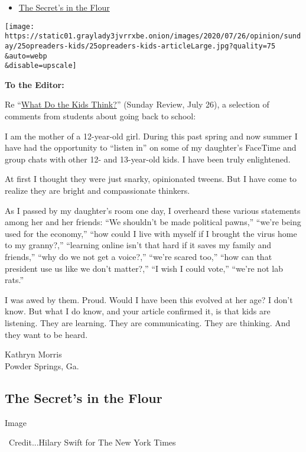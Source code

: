 \begin{itemize}
\tightlist
\item
  \protect\hyperlink{link-4c6cf7c0}{The Secret's in the Flour}
\end{itemize}

\texttt{[image: https://static01.graylady3jvrrxbe.onion/images/2020/07/26/opinion/sunday/25opreaders-kids/25opreaders-kids-articleLarge.jpg?quality=75\\\&auto=webp\\\&disable=upscale]}

\textbf{To the Editor:}

Re
``\href{https://www.nytimes3xbfgragh.onion/2020/07/25/opinion/sunday/coronavirus-kids-school.html}{What
Do the Kids Think?}'' (Sunday Review, July 26), a selection of comments
from students about going back to school:

I am the mother of a 12-year-old girl. During this past spring and now
summer I have had the opportunity to ``listen in'' on some of my
daughter's FaceTime and group chats with other 12- and 13-year-old kids.
I have been truly enlightened.

At first I thought they were just snarky, opinionated tweens. But I have
come to realize they are bright and compassionate thinkers.

As I passed by my daughter's room one day, I overheard these various
statements among her and her friends: ``We shouldn't be made political
pawns,'' ``we're being used for the economy,'' ``how could I live with
myself if I brought the virus home to my granny?,'' ``learning online
isn't that hard if it saves my family and friends,'' ``why do we not get
a voice?,'' ``we're scared too,'' ``how can that president use us like
we don't matter?,'' ``I wish I could vote,'' ``we're not lab rats.''

I was awed by them. Proud. Would I have been this evolved at her age? I
don't know. But what I do know, and your article confirmed it, is that
kids are listening. They are learning. They are communicating. They are
thinking. And they want to be heard.

Kathryn Morris\\
Powder Springs, Ga.

\hypertarget{the-secrets-in-the-flour}{%
\subsection{The Secret's in the Flour}\label{the-secrets-in-the-flour}}

Image

~Credit...Hilary Swift for The New York Times

